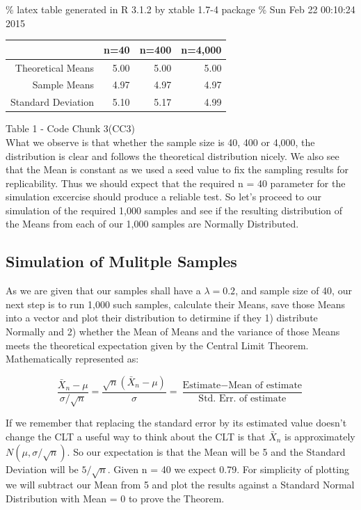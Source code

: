 \documentclass[]{article}
\begin{document}
\% latex table generated in R 3.1.2 by xtable 1.7-4 package \% Sun Feb
22 00:10:24 2015

\begin{table}[ht]
\centering
\begin{tabular}{rrrr}
  \hline
 & n=40 & n=400 & n=4,000 \\ 
  \hline
Theoretical Means & 5.00 & 5.00 & 5.00 \\ 
  Sample Means & 4.97 & 4.97 & 4.97 \\ 
  Standard Deviation & 5.10 & 5.17 & 4.99 \\ 
   \hline
\end{tabular}
\end{table}

Table 1 - Code Chunk 3(CC3)\\What we observe is that whether the sample
size is 40, 400 or 4,000, the distribution is clear and follows the
theoretical distribution nicely. We also see that the Mean is constant
as we used a seed value to fix the sampling results for replicability.
Thus we should expect that the required n = 40 parameter for the
simulation excercise should produce a reliable test. So let's proceed to
our simulation of the required 1,000 samples and see if the resulting
distribution of the Means from each of our 1,000 samples are Normally
Distributed.

\subsection{Simulation of Mulitple
Samples}\label{simulation-of-mulitple-samples}

As we are given that our samples shall have a $\lambda = 0.2$, and
sample size of 40, our next step is to run 1,000 such samples, calculate
their Means, save those Means into a vector and plot their distribution
to detirmine if they 1) distribute Normally and 2) whether the Mean of
Means and the variance of those Means meets the theoretical expectation
given by the Central Limit Theorem. Mathematically represented as:

\[\frac{\bar X_n - \mu}{\sigma / \sqrt{n}}= \frac{\sqrt n (\bar X_n - \mu)}{\sigma} = \frac{\mbox{Estimate} - \mbox{Mean of estimate}}{\mbox{Std. Err. of estimate}}\]

If we remember that replacing the standard error by its estimated value
doesn't change the CLT a useful way to think about the CLT is that
$\bar X_n$ is approximately $N(\mu, \sigma / \sqrt n)$. So our
expectation is that the Mean will be 5 and the Standard Deviation will
be $5 / \sqrt n$. Given n = 40 we expect 0.79. For simplicity of
plotting we will subtract our Mean from 5 and plot the results against a
Standard Normal Distribution with Mean = 0 to prove the Theorem.
\end{document}
